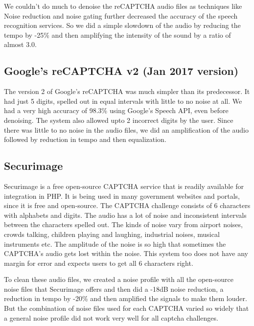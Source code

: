We couldn't do much to denoise the reCAPTCHA audio files as techniques like Noise reduction and noise gating further decreased the accuracy of the speech recognition services. So we did a simple slowdown of the audio by reducing the tempo by -25\% and then amplifying the intensity of the sound by a ratio of almost  3.0.\newline

\subsection{Google's reCAPTCHA v2 (Jan 2017 version)}
\label{sec:recaptchav2}
The version 2 of Google's reCAPTCHA was much simpler than its predecessor. It had just 5 digits, spelled out in equal intervals with little to no noise at all. We had a very high accuracy of 98.3\% using Google's Speech API, even before denoising. The system also allowed upto 2 incorrect digits by the user. Since there was little to no noise in the audio files, we did an amplification of the audio followed by reduction in tempo and then equalization.\newline

\subsection{Securimage}
\label{sec:securimage}
Securimage is a free open-source CAPTCHA service that is readily available for integration in PHP. It is being used in many government websites and portals, since it is free and open-source. The CAPTCHA challenge consists of 6 characters with alphabets and digits. The audio has a lot of noise and inconsistent intervals between the characters spelled out. The kinds of noise vary from airport noises, crowds talking, children playing and laughing, industrial noises, musical instruments etc. The amplitude of the noise is so high that sometimes the CAPTCHA's audio gets lost within the noise. This system too does not have any margin for error and expects users to get all 6 characters right.\newline

To clean these audio files, we created a noise profile with all the open-source noise files that Securimage offers and then did a -18dB noise reduction, a reduction in tempo by -20\% and then amplified the signals to make them louder. But the combination of noise files used for each CAPTCHA varied so widely that a general noise profile did not work very well for all captcha challenges.\newline

